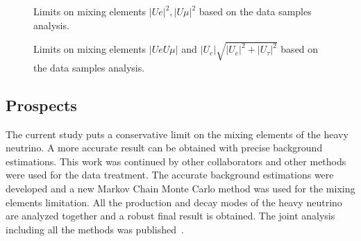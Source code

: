 \documentclass[../main.tex]{subfiles}
\begin{document}
\begin{figure}[!ht]
    \begin{center}
  \begin{minipage}{0.49\linewidth}
  \end{minipage}
  \hfill
  \begin{minipage}{0.49\linewidth}
  \end{minipage}
  \caption{Limits on mixing elements $\left|Ue\right|^2, \left|U\mu\right|^2$ based on the data samples analysis.}
  \label{fig:HNL:LimitsData1}
    \end{center}
\end{figure}

\begin{figure}[!ht]
    \begin{center}
  \begin{minipage}{0.49\linewidth}
  \end{minipage}
  \begin{minipage}{0.49\linewidth}
  \end{minipage}
  \caption{Limits on mixing elements $\left|UeU\mu\right|$ and $\left|U_{e}\right|\sqrt{\left|U_{e}\right|^2+\left|U_{\tau}\right|^2}$ based on the data samples analysis.}
  \label{fig:HNL:LimitsData2}
  \end{center}
\end{figure}

\subsection{Prospects}
\label{sec:HNL:prosp}
The current study puts a conservative limit on the mixing elements of the heavy neutrino. A more accurate result can be obtained with precise background estimations. This work was continued by other collaborators and other methods were used for the data treatment. The accurate background estimations were developed and a new Markov Chain Monte Carlo method was used for the mixing elements limitation. All the production and decay modes of the heavy neutrino are analyzed together and a robust final result is obtained. The joint analysis including all the methods was published~\cite{Abe2019l}.
\end{document}
